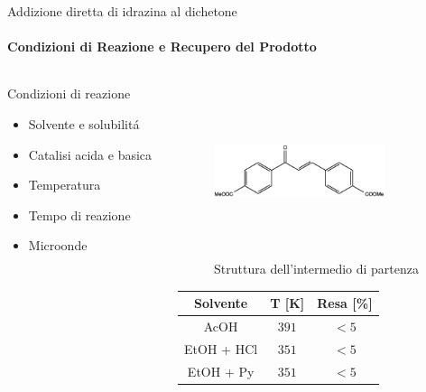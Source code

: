 \documentclass{beamer}
\begin{document}
\begin{frame}{Addizione diretta di idrazina al dichetone}
	\framesubtitle{Condizioni di Reazione e Recupero del Prodotto}
	\begin{columns}
		\hspace{1cm}
		\begin{column}{0.5\textwidth}
			Condizioni di reazione
			\begin{itemize}
				\item Solvente e solubilitá
				\item Catalisi acida e basica
				\item Temperatura
				\item Tempo di reazione
				\item Microonde
			\end{itemize}
		\end{column}
		\hspace{-3cm}
		\begin{column}{0.5\textwidth}
			\vspace{-0.5cm}
			\begin{figure}[h!]
				\centering
				\includegraphics[width=5cm,height=5cm,keepaspectratio]{../Structures/unsaturated.eps}
				\caption{Struttura dell'intermedio di partenza}
			\end{figure}
			\begin{footnotesize}
				\begin{center}
					\begin{tabular}{ccc}
						\toprule
						{Solvente} & T [K]   & Resa [\%] \\
						\midrule
						AcOH       & \(391\) & \(< 5\)   \\
						EtOH + HCl & \(351\) & \(< 5\)   \\
						EtOH + Py  & \(351\) & \(< 5\)   \\
						\bottomrule
					\end{tabular}
				\end{center}
			\end{footnotesize}
		\end{column}
	\end{columns}
\end{frame}
\end{document}
